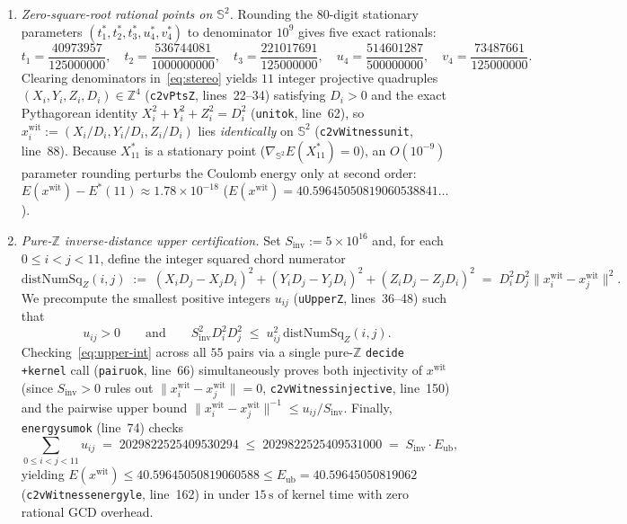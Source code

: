 \documentclass[11pt,reqno]{amsart}
\renewcommand{\_}{\origunderscore\allowbreak}
\theoremstyle{definition}
\newcommand{\Z}{\mathbb{Z}}
\newcommand{\Sph}{\mathbb{S}^2}
\newcommand{\norm}[1]{\lVert #1 \rVert}
\newcommand{\Xstar}{X^*_{11}}
\newcommand{\Eub}{E_{\mathrm{ub}}}
\begin{document}
\begin{enumerate}[leftmargin=2.2em]
  \item \emph{Zero-square-root rational points on $\Sph$.} Rounding the $80$-digit stationary parameters $(t_1^*, t_2^*, t_3^*, u_4^*, v_4^*)$ to denominator $10^9$ gives five exact rationals:
  \[
    t_1 = \frac{40973957}{125000000},\quad
    t_2 = \frac{536744081}{1000000000},\quad
    t_3 = \frac{221017691}{125000000},\quad
    u_4 = \frac{514601287}{500000000},\quad
    v_4 = \frac{73487661}{125000000}.
  \]
  Clearing denominators in~\eqref{eq:stereo} yields $11$ integer projective quadruples $(X_i, Y_i, Z_i, D_i) \in \Z^4$ (\texttt{c2vPtsZ}, lines~22--34) satisfying $D_i > 0$ and the exact Pythagorean identity $X_i^2 + Y_i^2 + Z_i^2 = D_i^2$ (\texttt{unit\_ok}, line~62), so $x_i^{\mathrm{wit}} := (X_i/D_i, Y_i/D_i, Z_i/D_i)$ lies \emph{identically} on $\Sph$ (\texttt{c2vWitness\_unit}, line~88).
  Because $\Xstar$ is a stationary point ($\nabla_{\Sph} E(\Xstar) = 0$), an $O(10^{-9})$ parameter rounding perturbs the Coulomb energy only at second order: $E(x^{\mathrm{wit}}) - E^*(11) \approx 1.78 \times 10^{-18}$ ($E(x^{\mathrm{wit}}) = 40.59645050819060538841\ldots$).
  \item \emph{Pure-$\Z$ inverse-distance upper certification.} Set $S_{\mathrm{inv}} := 5 \times 10^{16}$ and, for each $0 \le i < j < 11$, define the integer squared chord numerator
  \[
    \mathrm{distNumSq}_Z(i,j) \;:=\; (X_i D_j - X_j D_i)^2 + (Y_i D_j - Y_j D_i)^2 + (Z_i D_j - Z_j D_i)^2 \;=\; D_i^2 D_j^2 \norm{x_i^{\mathrm{wit}} - x_j^{\mathrm{wit}}}^2.
  \]
  We precompute the smallest positive integers $u_{ij}$ (\texttt{uUpperZ}, lines~36--48) such that
  \begin{equation}\label{eq:upper-int}
    u_{ij} > 0
    \qquad\text{and}\qquad
    S_{\mathrm{inv}}^2 D_i^2 D_j^2 \;\le\; u_{ij}^2\,\mathrm{distNumSq}_Z(i,j).
  \end{equation}
  Checking~\eqref{eq:upper-int} across all $55$ pairs via a single pure-$\Z$ \texttt{decide +kernel} call (\texttt{pair\_u\_ok}, line~66) simultaneously proves both injectivity of $x^{\mathrm{wit}}$ (since $S_{\mathrm{inv}} > 0$ rules out $\norm{x_i^{\mathrm{wit}} - x_j^{\mathrm{wit}}} = 0$, \texttt{c2vWitness\_injective}, line~150) and the pairwise upper bound $\norm{x_i^{\mathrm{wit}} - x_j^{\mathrm{wit}}}^{-1} \le u_{ij} / S_{\mathrm{inv}}$.
  Finally, \texttt{energy\_sum\_ok} (line~74) checks
  \[
    \sum_{0 \le i < j < 11} u_{ij} \;=\; 2029822525409530294 \;\le\; 2029822525409531000 \;=\; S_{\mathrm{inv}} \cdot \Eub,
  \]
  yielding $E(x^{\mathrm{wit}}) \le 40.59645050819060588 \le \Eub = 40.59645050819062$ (\texttt{c2vWitness\_energy\_le}, line~162) in under $15\,\mathrm{s}$ of kernel time with zero rational GCD overhead.
\end{enumerate}
\end{document}
